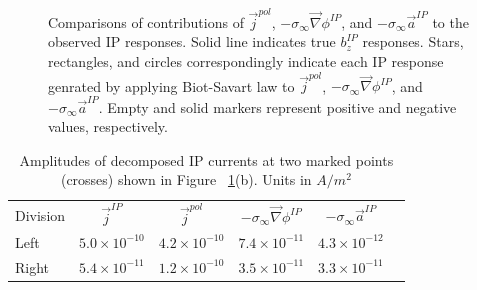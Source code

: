 \documentclass[extra,mreferee]{gji}
\newcommand{\grad}{\vec \nabla}
\newcommand{\siginf}{\sigma_\infty}
\renewcommand {\j}  { {\vec j} }
\begin{document}
\begin{figure}
  \caption{Comparisons of contributions of $\j^{pol}$, $-\siginf\grad \phi^{IP}$, and $-\siginf\vec{a}^{IP}$ to the observed IP responses. Solid line indicates true $b_z^{IP}$ responses. Stars, rectangles, and circles correspondingly indicate each IP response genrated by applying Biot-Savart law to $\j^{pol}$, $-\siginf\grad \phi^{IP}$, and $-\siginf\vec{a}^{IP}$. Empty and solid markers represent positive and negative values, respectively. }
  \label{F:DecompjIPcond}
\end{figure}

\begin{table}
 \caption{Amplitudes of decomposed IP currents at two marked points (crosses) shown in Figure ~\ref{F:DecompjIPcond}(b). Units in $A/m^2$}
 \label{T:DecompjIPcond}
 \begin{tabular}{@{}lccccc}
  Division & $\j^{IP}$ & $\j^{pol}$ & $-\siginf\grad \phi^{IP}$ & $-\siginf\vec{a}^{IP}$ \\
  Left  & $5.0\times 10^{-10}$ & $4.2\times 10^{-10}$ & $7.4\times 10^{-11}$ & $4.3\times 10^{-12}$ \\
  Right & $5.4\times 10^{-11}$ & $1.2\times 10^{-10}$ & $3.5\times 10^{-11}$ & $3.3\times 10^{-11}$ \\
 \end{tabular}
\end{table}

\clearpage

\end{document}
